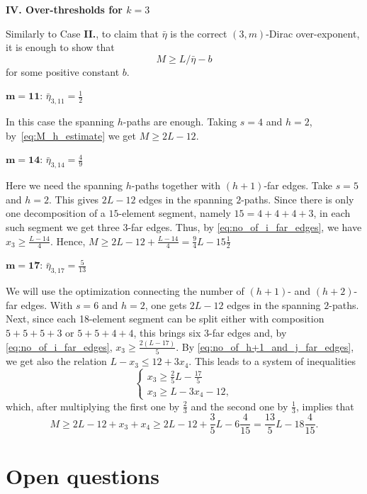 \documentclass[reqno, 12pt]{amsart}
\numberwithin{equation}{section}
\numberwithin{figure}{section}
\theoremstyle{plain}
\theoremstyle{definition}
\begin{document}
\medskip


{\bf IV. Over-thresholds for $k=3$}

\medskip

Similarly to Case {\bf II.}, to claim that $\bar{\eta}$ is the correct $(3,m)$-Dirac over-exponent, it is enough to show that
\[ M \geq L/\bar{\eta}-b\]
for some positive constant $b$.

\medskip

    $\mathbf{m=11}$: $\bar \eta_{3,11}=\frac12$

\medskip

In this case the spanning $h$-paths are enough. Taking $s=4$ and $h=2$, by~\eqref{eq:M_h_estimate} we get $M\geq 2L - 12$.

\medskip

    $\mathbf{m=14}$: $\bar \eta_{3,14}=\frac49$

\medskip

Here we need the spanning $h$-paths together with $(h+1)$-far edges. Take $s=5$ and $h=2$. This gives $2L-12$ edges in the spanning $2$-paths. Since there is only one decomposition of a $15$-element segment, namely $15=4+4+4+3$, in each such segment we get three $3$-far edges. Thus, by \eqref{eq:no_of_i_far_edges}, we have $x_3\geq \frac{L-14}{4}$. Hence, $M \geq 2L-12+\frac{L-14}{4} = \frac94L -15\frac12$

\medskip

    $\mathbf{m=17}$: $\bar \eta_{3,17}=\frac5{13}$

\medskip

We will use the optimization connecting the number of $(h+1)$- and $(h+2)$-far edges. With $s=6$ and $h=2$, one gets
$2L-12$ edges in the spanning $2$-paths.
Next, since each 18-element segment can be split either with composition $5+5+5+3$ or $5+5+4+4$, this brings six 3-far edges and, by \eqref{eq:no_of_i_far_edges}, $x_3 \geq \frac{2(L-17)}{5}$. By \eqref{eq:no_of_h+1_and_j_far_edges}, we get also the relation $L-x_3 \leq 12+3x_4$. This leads to a system of inequalities
\[
\begin{cases}
    x_3 \geq \frac{2}{5}L - \frac{17}5 \\
    x_3 \geq L - 3x_4 -12,
\end{cases}
\]
which, after multiplying the first one by $\frac23$ and the second one by $\frac13$, implies that
\[ M \geq 2L-12 + x_3 + x_4 \geq 2L-12 + \frac35L - 6\frac{4}{15} = \frac{13}5L - 18\frac{4}{15}. \]
	
	
\section{Open questions}
\end{document}
